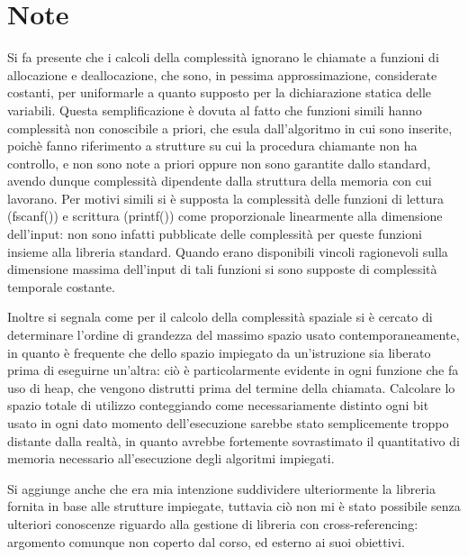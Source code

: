 \documentclass[a4paper,11pt]{Article}
\begin{document}
\section{Note}
Si fa presente che i calcoli della complessità ignorano le chiamate a funzioni di allocazione e deallocazione, che sono, in pessima approssimazione, considerate costanti, per uniformarle a quanto supposto per la dichiarazione statica delle variabili. Questa semplificazione è dovuta al fatto che funzioni simili hanno complessità non conoscibile a priori, che esula dall'algoritmo in cui sono inserite, poichè fanno riferimento a strutture su cui la procedura chiamante non ha controllo, e non sono note a priori oppure non sono garantite dallo standard, avendo dunque complessità dipendente dalla struttura della memoria con cui lavorano.
Per motivi simili si è supposta la complessità delle funzioni di lettura (fscanf()) e scrittura (printf()) come proporzionale linearmente alla dimensione dell'input: non sono infatti pubblicate delle complessità per queste funzioni insieme alla libreria standard. Quando erano disponibili vincoli ragionevoli sulla dimensione massima dell'input di tali funzioni si sono supposte di complessità temporale costante.

Inoltre si segnala come per il calcolo della complessità spaziale si è cercato di determinare l'ordine di grandezza del massimo spazio usato contemporaneamente, in quanto è frequente che dello spazio impiegato da un'istruzione sia liberato prima di eseguirne un'altra: ciò è particolarmente evidente in ogni funzione che fa uso di heap, che vengono distrutti prima del termine della chiamata. Calcolare lo spazio totale di utilizzo conteggiando come necessariamente distinto ogni bit usato in ogni dato momento dell'esecuzione sarebbe stato semplicemente troppo distante dalla realtà, in quanto avrebbe fortemente sovrastimato il quantitativo di memoria necessario all'esecuzione degli algoritmi impiegati.

Si aggiunge anche che era mia intenzione suddividere ulteriormente la libreria fornita in base alle strutture impiegate, tuttavia ciò non mi è stato possibile senza ulteriori conoscenze riguardo alla gestione di libreria con cross-referencing: argomento comunque non coperto dal corso, ed esterno ai suoi obiettivi.
\end{document}
